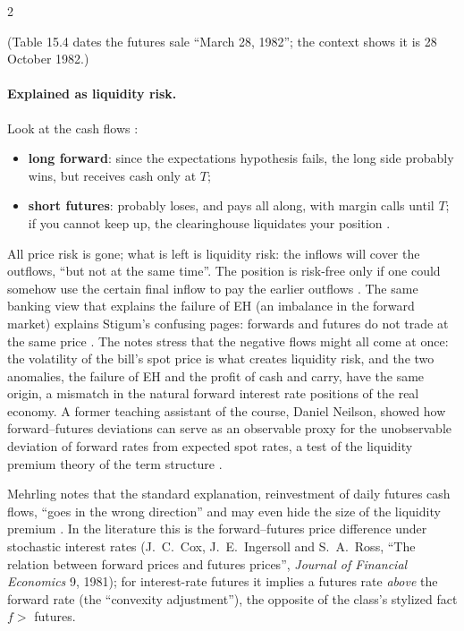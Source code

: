 \begin{paracol}{2}
\begin{reading}
(Table 15.4 dates the futures sale ``March 28, 1982''; the context shows it is 28 October 1982.)
\end{reading}

\paragraph{Explained as liquidity risk.} Look at the cash flows :
\begin{itemize}
  \item \textbf{long forward}: since the expectations hypothesis fails, the long side probably wins, but receives cash only at $T$;
  \item \textbf{short futures}: probably loses, and pays all along, with margin calls until $T$; if you cannot keep up, the clearinghouse liquidates your
        position .
\end{itemize}
All price risk is gone; what is left is liquidity risk: the inflows will cover the outflows, ``but not at the same time''. The position is risk-free only if one could
somehow use the certain final inflow to pay the earlier outflows . The same banking view that explains the failure
of EH (an imbalance in the forward market) explains Stigum's confusing pages: forwards and futures do not trade at the same price . The notes stress that the negative
flows might all come at once: the volatility of the bill's spot price is what creates liquidity risk, and the two anomalies, the failure of EH and the profit of cash and carry, have the same origin,
a mismatch in the natural forward interest rate positions of the real economy. A former teaching assistant of the course, Daniel Neilson, showed how forward--futures deviations can serve as
an observable proxy for the unobservable deviation of forward rates from expected spot rates, a test of the liquidity premium theory of the term structure .

\begin{coursenote}
Mehrling notes that the standard explanation, reinvestment of daily futures cash flows, ``goes in the wrong direction'' and may even hide the size of the liquidity
premium . In the literature this is the forward--futures price difference under stochastic interest
rates (J.~C.~Cox, J.~E.~Ingersoll and S.~A.~Ross, ``The relation between forward prices and futures prices'', \emph{Journal of Financial Economics} 9, 1981); for
interest-rate futures it implies a futures rate \emph{above} the forward rate (the ``convexity adjustment''), the opposite of the class's stylized fact
$f>$ futures.
\end{coursenote}


\end{paracol}

